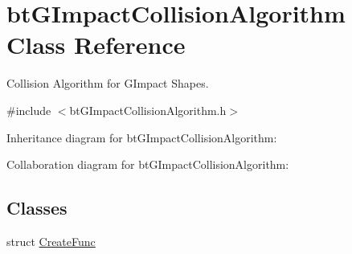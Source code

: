 \hypertarget{classbt_g_impact_collision_algorithm}{\section{bt\+G\+Impact\+Collision\+Algorithm Class Reference}
\label{classbt_g_impact_collision_algorithm}
}


Collision Algorithm for G\+Impact Shapes.  




{\ttfamily \#include $<$bt\+G\+Impact\+Collision\+Algorithm.\+h$>$}



Inheritance diagram for bt\+G\+Impact\+Collision\+Algorithm\+:


Collaboration diagram for bt\+G\+Impact\+Collision\+Algorithm\+:
\subsection*{Classes}
\begin{DoxyCompactItemize}
\item 
struct \hyperlink{structbt_g_impact_collision_algorithm_1_1_create_func}{Create\+Func}
\end{DoxyCompactItemize}
